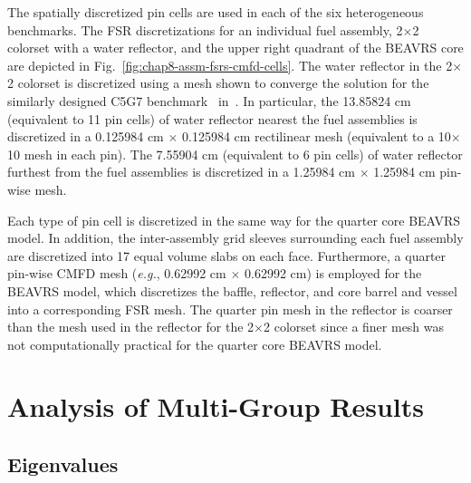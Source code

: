 The spatially discretized pin cells are used in each of the six heterogeneous benchmarks. The \ac{FSR} discretizations for an individual fuel assembly, 2$\times$2 colorset with a water reflector, and the upper right quadrant of the \ac{BEAVRS} core are depicted in Fig.~\ref{fig:chap8-assm-fsrs-cmfd-cells}. The water reflector in the 2$\times$2 colorset is discretized using a mesh shown to converge the solution for the similarly designed C5G7 benchmark~\cite{lewis2003c5g7} in~\cite{boyd2014ms}. In particular, the 13.85824 cm (equivalent to 11 pin cells) of water reflector nearest the fuel assemblies is discretized in a 0.125984 cm $\times$ 0.125984 cm rectilinear mesh (equivalent to a 10$\times$10 mesh in each pin). The 7.55904 cm (equivalent to 6 pin cells) of water reflector furthest from the fuel assemblies is discretized in a 1.25984 cm $\times$ 1.25984 cm pin-wise mesh.

Each type of pin cell is discretized in the same way for the quarter core \ac{BEAVRS} model. In addition, the inter-assembly grid sleeves surrounding each fuel assembly are discretized into 17 equal volume slabs on each face. Furthermore, a quarter pin-wise \ac{CMFD} mesh (\textit{e.g.}, 0.62992 cm $\times$ 0.62992 cm) is employed for the \ac{BEAVRS} model, which discretizes the baffle, reflector, and core barrel and vessel into a corresponding \ac{FSR} mesh. The quarter pin mesh in the reflector is coarser than the mesh used in the reflector for the 2$\times$2 colorset since a finer mesh was not computationally practical for the quarter core \ac{BEAVRS} model.


\section{Analysis of Multi-Group Results}
\label{sec:chap8-mg-results}


\subsection{Eigenvalues}
\label{subsec:chap8-eigenvalues}

